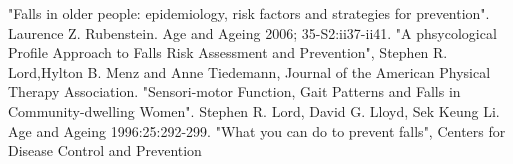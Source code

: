 \begin{thebibliography}{99}
"Falls in older people: epidemiology, risk factors and strategies for prevention". Laurence Z. Rubenstein. Age and Ageing 2006; 35-S2:ii37-ii41.
"A phsycological Profile Approach to Falls Risk Assessment and Prevention", Stephen R. Lord,Hylton B. Menz and Anne Tiedemann, Journal of the American Physical Therapy Association. 
"Sensori-motor Function, Gait Patterns and Falls in Community-dwelling Women". Stephen R. Lord, David G. Lloyd, Sek Keung Li. Age and Ageing 1996:25:292-299.
  "What you can do to prevent falls", Centers for Disease Control and Prevention
  
\end{thebibliography}